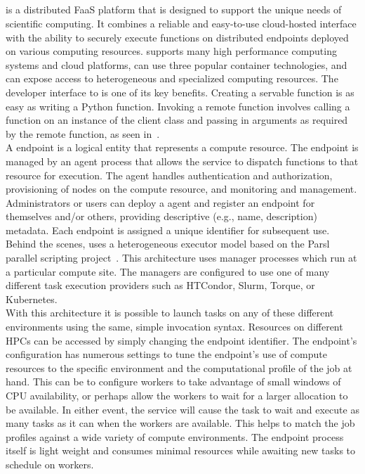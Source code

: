 \subsection{\funcX{}}\label{subsec:funcX}
\funcX{} is a distributed FaaS platform that is designed to support the unique needs of scientific computing. It combines a reliable and easy-to-use cloud-hosted interface with the ability to securely execute functions on distributed endpoints deployed on various computing resources. \funcX{} supports many high performance computing systems and cloud platforms, can use three popular container technologies, and can expose access to heterogeneous and specialized computing resources. The developer interface to \funcX{} is one of its key benefits. Creating a servable function is as easy as writing a Python function. Invoking a remote function involves calling a function on an instance of the \funcX{} client class and passing in arguments as required by the remote function, as seen in~.\\

A \funcX{} endpoint is a logical entity that represents a compute resource. The endpoint is managed by an agent process that allows the \funcX{} service to dispatch functions to that resource for execution. The agent handles authentication and authorization, provisioning of nodes on the compute resource, and monitoring and management. Administrators or users can deploy a \funcX{} agent and register an endpoint for themselves and/or others, providing descriptive (e.g., name, description) metadata. Each endpoint is assigned a unique identifier for subsequent use.
\\

Behind the scenes, \funcX{} uses a heterogeneous executor model based on the Parsl parallel scripting project~\cite{Parsl_paper}.  This architecture uses manager processes which run at a particular compute site. The managers are configured to use one of many different task execution providers such as HTCondor, Slurm, Torque, or Kubernetes.\\

With this architecture it is possible to launch tasks on any of these different environments using the same, simple invocation syntax. Resources on different HPCs can be accessed by simply changing the endpoint identifier. The endpoint's configuration has numerous settings to tune the endpoint's use of compute resources to the specific environment and the computational profile of the job at hand. This can be to configure workers to take advantage of small windows of CPU availability, or perhaps allow the workers to wait for a larger allocation to be available. In either event, the \funcX{} service will cause the task to wait and execute as many tasks as it can when the workers are available.  This helps to match the job profiles against a wide variety of compute environments. The endpoint process itself is light weight and consumes minimal resources while awaiting new tasks to schedule on workers.\\

